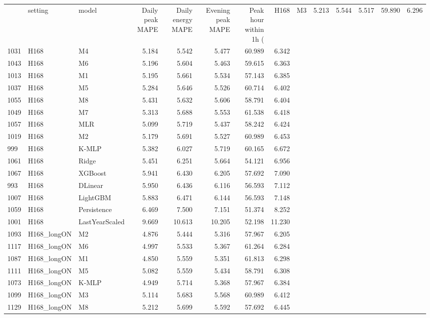 \begin{tabular}{lllrrrrr}
\toprule
 & setting & model & Daily peak MAPE & Daily energy MAPE & Evening peak MAPE & Peak hour within 1h (%
 & H168 & M3 & 5.213 & 5.544 & 5.517 & 59.890 & 6.296 \\
1031 & H168 & M4 & 5.184 & 5.542 & 5.477 & 60.989 & 6.342 \\
1043 & H168 & M6 & 5.196 & 5.604 & 5.463 & 59.615 & 6.363 \\
1013 & H168 & M1 & 5.195 & 5.661 & 5.534 & 57.143 & 6.385 \\
1037 & H168 & M5 & 5.284 & 5.646 & 5.526 & 60.714 & 6.402 \\
1055 & H168 & M8 & 5.431 & 5.632 & 5.606 & 58.791 & 6.404 \\
1049 & H168 & M7 & 5.313 & 5.688 & 5.553 & 61.538 & 6.418 \\
1057 & H168 & MLR & 5.099 & 5.719 & 5.437 & 58.242 & 6.424 \\
1019 & H168 & M2 & 5.179 & 5.691 & 5.527 & 60.989 & 6.453 \\
999 & H168 & K-MLP & 5.382 & 6.027 & 5.719 & 60.165 & 6.672 \\
1061 & H168 & Ridge & 5.451 & 6.251 & 5.664 & 54.121 & 6.956 \\
1067 & H168 & XGBoost & 5.941 & 6.430 & 6.205 & 57.692 & 7.090 \\
993 & H168 & DLinear & 5.950 & 6.436 & 6.116 & 56.593 & 7.112 \\
1007 & H168 & LightGBM & 5.883 & 6.471 & 6.144 & 56.593 & 7.148 \\
1059 & H168 & Persistence & 6.469 & 7.500 & 7.151 & 51.374 & 8.252 \\
1001 & H168 & LastYearScaled & 9.669 & 10.613 & 10.205 & 52.198 & 11.230 \\
1093 & H168_longON & M2 & 4.876 & 5.444 & 5.316 & 57.967 & 6.205 \\
1117 & H168_longON & M6 & 4.997 & 5.533 & 5.367 & 61.264 & 6.284 \\
1087 & H168_longON & M1 & 4.850 & 5.559 & 5.351 & 61.813 & 6.298 \\
1111 & H168_longON & M5 & 5.082 & 5.559 & 5.434 & 58.791 & 6.308 \\
1073 & H168_longON & K-MLP & 4.949 & 5.714 & 5.368 & 57.967 & 6.384 \\
1099 & H168_longON & M3 & 5.114 & 5.683 & 5.568 & 60.989 & 6.412 \\
1129 & H168_longON & M8 & 5.212 & 5.699 & 5.592 & 57.692 & 6.445 \\

\end{tabular}

